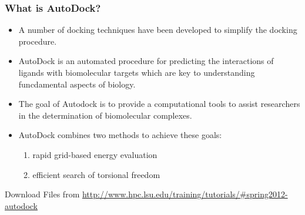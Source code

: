 \documentclass[slidestop,mathserif,compress,xcolor=svgnames]{beamer}
\newenvironment{bblock}[0]
{
\begin{beamerboxesrounded}[upper=uppercol1,lower=lowercol1,shadow=true]}
{\end{beamerboxesrounded}}
\begin{document}
\begin{frame}%
  \frametitle{\small What is AutoDock?}
  \begin{itemize}
    \item A number of docking techniques have been developed to simplify the docking procedure.
    \item AutoDock is an automated procedure for predicting the interactions of ligands with biomolecular targets which are key to understanding funcdamental aspects of biology.
    \item The goal of Autodock is to provide a computational tools to assist researchers in the determination of biomolecular complexes.
    \item AutoDock combines two methods to achieve these goals:
    \begin{enumerate}
      \item rapid grid-based energy evaluation
      \item efficient search of torsional freedom
    \end{enumerate}
  \end{itemize}
  
  \begin{bblock}{Download Files from}
    \url{http://www.hpc.lsu.edu/training/tutorials/\#spring2012-autodock}
  \end{bblock}


\end{frame}
\end{document}
